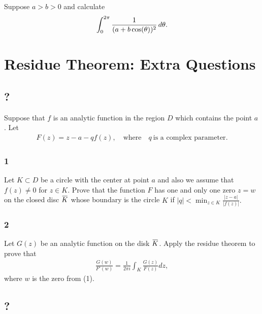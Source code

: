 Suppose \(a>b>0\) and calculate
\begin{align*}
\int_0^{2\pi} {1 \over (a+b\cos(\theta))^2} \,d\theta
.\end{align*}

\hypertarget{residue-theorem-extra-questions}{%
\section{Residue Theorem: Extra
Questions}\label{residue-theorem-extra-questions}}

\hypertarget{section-10}{%
\subsection{?}\label{section-10}}

Suppose that \(f\) is an analytic function in the region \(D\) which
contains the point \(a\). Let
\begin{align*}F(z)= z-a-qf(z),\quad \text{where}\quad q \ \text{is a complex
parameter}.\end{align*}

\hypertarget{section-11}{%
\subsubsection{1}\label{section-11}}

Let \(K\subset D\) be a circle with the center at point \(a\) and also
we assume that \(f(z)\not =0\) for \(z\in K\). Prove that the function
\(F\) has one and only one zero \(z=w\) on the closed disc
\(\mkern 1.5mu\overline{\mkern-1.5muK\mkern-1.5mu}\mkern 1.5mu\) whose
boundary is the circle \(K\) if
\(\displaystyle{ |q|<\min_{z\in K} \frac{|z-a|}{|f(z)|}.}\)\\

\hypertarget{section-12}{%
\subsubsection{2}\label{section-12}}

Let \(G(z)\) be an analytic function on the disk
\(\mkern 1.5mu\overline{\mkern-1.5muK\mkern-1.5mu}\mkern 1.5mu\). Apply
the residue theorem to prove that
\begin{align*}
\displaystyle{ \frac{G(w)}{F'(w)}=\frac{1}{2\pi i}\int_K \frac{G(z)}{F(z)} dz,}
\end{align*}
where \(w\) is the zero from (1).

\hypertarget{section-13}{%
\subsection{?}\label{section-13}}

